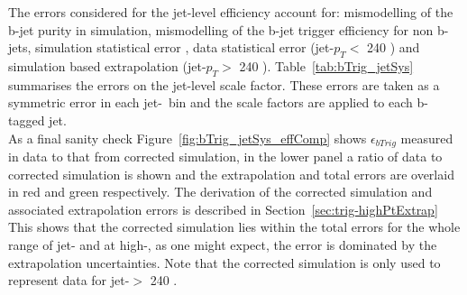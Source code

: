 The errors considered for the jet-level efficiency account for:
mismodelling of the b-jet purity in simulation, mismodelling of the b-jet trigger efficiency for non b-jets,
simulation statistical error , data statistical error (jet-$p_T <$ 240 \GeV) and simulation based extrapolation (jet-$p_T >$ 240 \GeV).
Table~\ref{tab:bTrig_jetSys} summarises the errors on the jet-level scale factor.
These errors are taken as a symmetric error in each jet-\pT~bin and the scale factors are applied to each b-tagged jet.\\

As a final sanity check Figure~\ref{fig:bTrig_jetSys_effComp} shows $\epsilon_{bTrig}$ measured in data to
that from corrected simulation, in the lower panel a ratio of data to corrected simulation is shown
and the extrapolation and total errors are overlaid in red and green respectively.
The derivation of the corrected simulation and associated extrapolation errors is described in Section~\ref{sec:trig-highPtExtrap}
This shows that the corrected simulation lies within the total errors for the whole range of jet-\pT
and at high-\pT, as one might expect, the error is dominated by the extrapolation uncertainties.
Note that the corrected simulation is only used to represent data for jet-\pT $>$ 240 \GeV.

